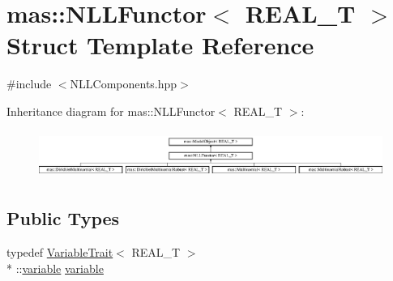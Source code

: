 \hypertarget{structmas_1_1_n_l_l_functor}{\section{mas\-:\-:N\-L\-L\-Functor$<$ R\-E\-A\-L\-\_\-\-T $>$ Struct Template Reference}
\label{structmas_1_1_n_l_l_functor}
}


{\ttfamily \#include $<$N\-L\-L\-Components.\-hpp$>$}

Inheritance diagram for mas\-:\-:N\-L\-L\-Functor$<$ R\-E\-A\-L\-\_\-\-T $>$\-:\begin{figure}[H]
\begin{center}
\leavevmode
\includegraphics[height=1.578947cm]{structmas_1_1_n_l_l_functor}
\end{center}
\end{figure}
\subsection*{Public Types}
\begin{DoxyCompactItemize}
\item 
typedef \hyperlink{structmas_1_1_variable_trait}{Variable\-Trait}$<$ R\-E\-A\-L\-\_\-\-T $>$\\*
\-::\hyperlink{structmas_1_1_model_object_a4e62fdbb5826f8fac311262b888ab10a}{variable} \hyperlink{structmas_1_1_n_l_l_functor_af0af5a53b4f1a30a9cf498e6d284c402}{variable}
\end{DoxyCompactItemize}
